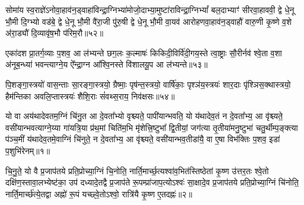 सोमा॑य स्व॒राज्ञे॑\-ऽनोवा॒हाव॑न॒ड्वाहा॑विन्द्रा॒ग्निभ्या॑मोजो॒दाभ्या॒मुष्टा॑राविन्द्रा॒ग्नि\-भ्यां᳚ बल॒दाभ्याꣳ॑ सीरवा॒हाववी॒ द्वे धे॒नू भौ॒मी दि॒ग्भ्यो वड॑बे॒ द्वे धे॒नू भौ॒मी वै॑रा॒जी पु॑रु॒षी द्वे धे॒नू भौ॒मी वा॒यव॑ आरोहणवा॒हाव॑न॒ड्वाहौ॑ वारु॒णी कृ॒ष्णे व॒शे अ॑रा॒ड्यौ॑ दि॒व्यावृ॑ष॒भौ प॑रिम॒रौ॥५२॥

{\anuvakamend[{सोमा॑य स्व॒राज्ञे॒ चतु॑स्त्रिꣳशत्॥21॥}]}

एका॑दश प्रा॒तर्ग॒व्याः प॒शव॒ आ ल॑भ्यन्ते छग॒लः क॒ल्माषः॑ किकिदी॒विर्वि॑दी॒गय॒स्ते त्वा॒ष्ट्राः सौ॒रीर्नव॑ श्वे॒ता व॒शा अ॑नूब॒न्ध्या॑ भवन्त्याग्ने॒य ऐ᳚न्द्रा॒ग्न आ᳚श्वि॒नस्ते वि॑शालयू॒प आ ल॑भ्यन्ते॥५३॥

{\anuvakamend[{एका॑दश॒ पञ्च॑विꣳशतिः॥22॥}]}

पि॒शङ्गा॒स्त्रयो॑ वास॒न्ताः सा॒रङ्गा॒स्त्रयो॒ ग्रैष्माः॒ पृष॑न्त॒स्त्रयो॒ वार्\mbox{}षि॑काः॒ पृश्ञ॑य॒स्त्रयः॑ शार॒दाः पृ॑श्ञिस॒क्थास्त्रयो॒ हैम॑न्तिका अवलि॒प्तास्त्रयः॑ शैशि॒राः सं॑वथ्स॒राय॒ निव॑क्षसः॥५४॥


{\anuvakamend[{पि॒शङ्गा॑ विꣳश॒तिः॥23॥}]}

{}

\setcounter{anuvakam}{0}
यो वा अय॑थादेवतम॒ग्निं चि॑नु॒त आ दे॒वता᳚भ्यो वृश्च्यते॒ पापी॑यान्भवति॒ यो य॑थादेव॒तं न दे॒वता᳚भ्य॒ आ वृ॑श्च्यते॒ वसी॑यान्भवत्याग्ने॒य्या गा॑यत्रि॒या प्र॑थ॒मां चिति॑म॒भि मृ॑शेत्त्रि॒ष्टुभा᳚ द्वि॒तीयां॒ जग॑त्या तृ॒तीया॑मनु॒ष्टुभा॑ चतु॒र्थीम्प॒ङ्क्त्या प॑ञ्च॒मीं य॑थादेव॒तमे॒वाग्निं चि॑नुते॒ न दे॒वता᳚भ्य॒ आ वृ॑श्च्यते॒ वसी॑यान्भव॒तीडा॑यै॒ वा ए॒षा विभ॑क्तिः प॒शव॒ इडा॑ प॒शुभि॑रेनम्॥१॥

चि॒नु॒ते॒ यो वै प्र॒जाप॑तये प्रति॒प्रोच्या॒ग्निं चि॒नोति॒ नार्ति॒मार्च्छ॒त्यश्वा॑व॒भित॑स्तिष्ठेतां कृ॒ष्ण उ॑त्तर॒तः श्वे॒तो दक्षि॑ण॒\-स्तावा॒लभ्येष्ट॑का॒ उप॑ दध्यादे॒तद्वै प्र॒जाप॑ते रू॒पम्प्रा॑जाप॒त्यो\-ऽश्वः॑ सा॒क्षादे॒व प्र॒जाप॑तये प्रति॒प्रोच्या॒ग्निं चि॑नोति॒ नार्ति॒मार्च्छ॑त्ये॒तद्वा अह्नो॑ रू॒पं यच्छ्वे॒तो\-ऽश्वो॒ रात्रि॑यै कृ॒ष्ण ए॒तदह्नः॑॥२॥

